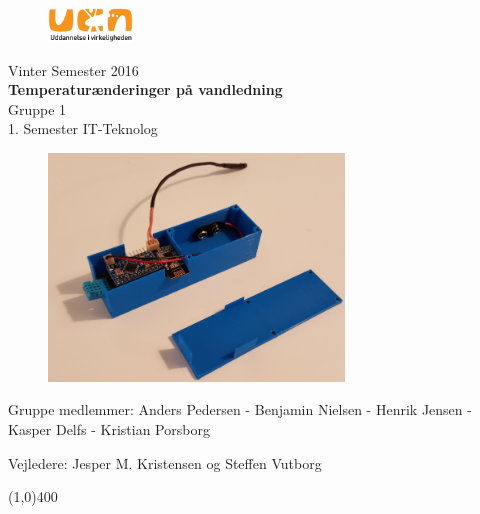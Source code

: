 \clearpage
\thispagestyle{empty}

\begin{figure}[H]
	\raggedleft
		\includegraphics[width=0.2\textwidth]{figures/logo-ucn.png}
\end{figure}
\vspace*{\fill} 
\begin{center}
\begin{Huge}
Vinter Semester 2016\\
\vspace{5 mm}
\textbf{Temperaturænderinger på vandledning}\\
\vspace{3 mm}
Gruppe 1\\
\vspace{3 mm}
1. Semester IT-Teknolog
\end{Huge}
\end{center}

\begin{figure}[h!]
  \centering
  \includegraphics[width=0.7\textwidth]{figures/produkt.png}
\end{figure}

\vspace*{\fill}
\begin{center}
Gruppe medlemmer:
 Anders Pedersen - Benjamin Nielsen - Henrik Jensen - Kasper Delfs - Kristian Porsborg
\end{center}
\begin{center}
Vejledere: Jesper M. Kristensen og Steffen Vutborg
\end{center}
\begin{center}
\line(1,0){400}
\end{center}